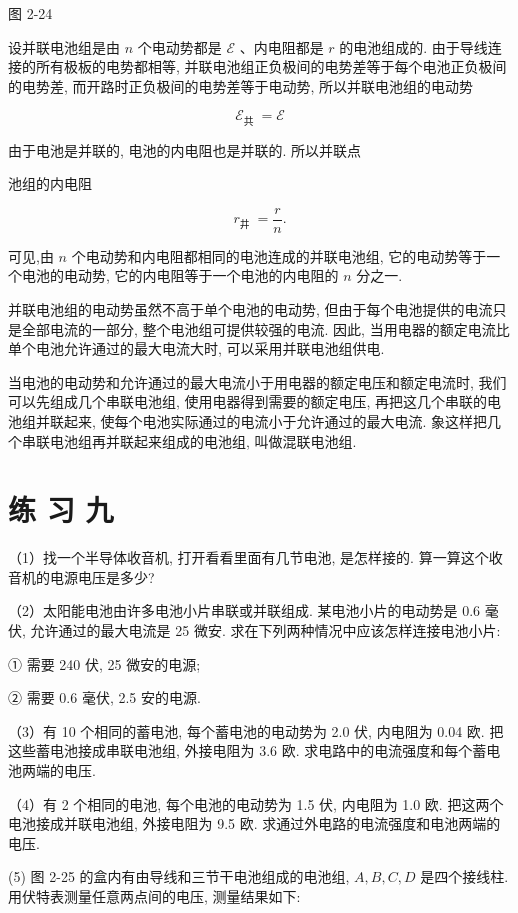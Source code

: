 \documentclass[10pt]{article}
\begin{document}
图 2-24

设并联电池组是由 \(n\) 个电动势都是 \(\mathcal{E}\) 、内电阻都是 \(r\) 的电池组成的. 由于导线连接的所有极板的电势都相等, 并联电池组正负极间的电势差等于每个电池正负极间的电势差, 而开路时正负极间的电势差等于电动势, 所以并联电池组的电动势

\[
{\mathcal{E}}_{\text{共 }} = \mathcal{E}
\]

由于电池是并联的, 电池的内电阻也是并联的. 所以并联点

池组的内电阻

\[
{r}_{\text{井 }} = \frac{r}{n}.
\]

可见,由 \(n\) 个电动势和内电阻都相同的电池连成的并联电池组, 它的电动势等于一个电池的电动势, 它的内电阻等于一个电池的内电阻的 \(n\) 分之一.

并联电池组的电动势虽然不高于单个电池的电动势, 但由于每个电池提供的电流只是全部电流的一部分, 整个电池组可提供较强的电流. 因此, 当用电器的额定电流比单个电池允许通过的最大电流大时, 可以采用并联电池组供电.

当电池的电动势和允许通过的最大电流小于用电器的额定电压和额定电流时, 我们可以先组成几个串联电池组, 使用电器得到需要的额定电压, 再把这几个串联的电池组并联起来, 使每个电池实际通过的电流小于允许通过的最大电流. 象这样把几个串联电池组再并联起来组成的电池组, 叫做混联电池组.

\section*{练 习 九}

（1）找一个半导体收音机, 打开看看里面有几节电池, 是怎样接的. 算一算这个收音机的电源电压是多少?

（2）太阳能电池由许多电池小片串联或并联组成. 某电池小片的电动势是 0.6 毫伏, 允许通过的最大电流是 25 微安. 求在下列两种情况中应该怎样连接电池小片:

① 需要 240 伏, 25 微安的电源;

② 需要 0.6 毫伏, 2.5 安的电源.

（3）有 10 个相同的蓄电池, 每个蓄电池的电动势为 2.0 伏, 内电阻为 0.04 欧. 把这些蓄电池接成串联电池组, 外接电阻为 3.6 欧. 求电路中的电流强度和每个蓄电池两端的电压.

（4）有 2 个相同的电池, 每个电池的电动势为 1.5 伏, 内电阻为 1.0 欧. 把这两个电池接成并联电池组, 外接电阻为 9.5 欧. 求通过外电路的电流强度和电池两端的电压.

(5) 图 2-25 的盒内有由导线和三节干电池组成的电池组, \(A,B,C,D\) 是四个接线柱. 用伏特表测量任意两点间的电压, 测量结果如下:
\end{document}
